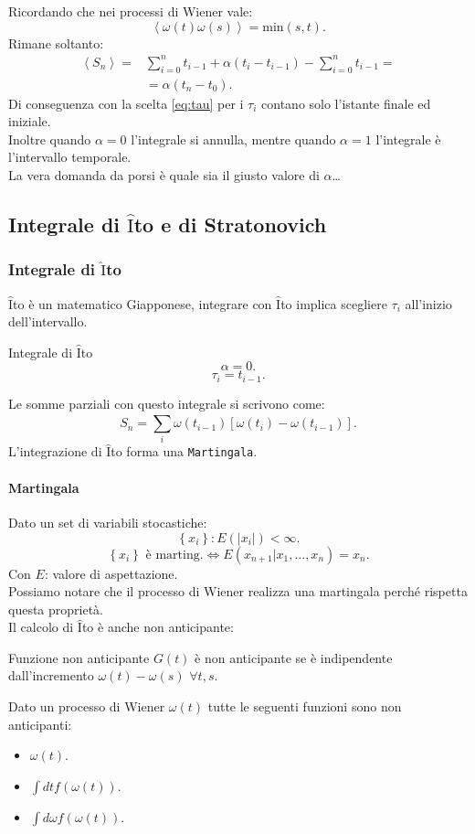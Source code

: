 Ricordando che nei processi di Wiener vale:
\[
    \left<\omega (t) \omega (s) \right> = \text{min}(s,t) 
.\] 
Rimane soltanto:
\[\begin{aligned}
    \left<S_n\right> =& \sum_{i=0}^{n} t_{i-1} + \alpha (t_i-t_{i-1}) -\sum_{i=0}^{n} t_{i-1} = \\
		      & =\alpha(t_n-t_0) 
.\end{aligned}\]
Di conseguenza con la scelta \ref{eq:tau} per i $\tau_i$ contano solo l'istante finale ed iniziale. \\
Inoltre quando $\alpha =0$ l'integrale si annulla, mentre quando $\alpha =1$ l'integrale è l'intervallo temporale.\\
La vera domanda da porsi è quale sia il giusto valore di $\alpha$\ldots
\subsection{Integrale di $\hat{\text{I}}$to e di Stratonovich}%
\label{sub:Integrale di Ito e di Stratonovich}
\subsubsection{Integrale di $\hat{\text{I}}$to}%
\label{subsub:Integrale di Ito}
$\hat{\text{I}}$to è un matematico Giapponese, integrare con $\hat{\text{I}}$to implica scegliere $\tau_i$ all'inizio dell'intervallo.
\begin{bluebox}{Integrale di $\hat{\text{I}}$to}
    \[
        \alpha  = 0
    .\] 
    \[
	\tau_i = t_{i-1}
    .\] 
\end{bluebox}
\noindent
Le somme parziali con questo integrale si scrivono come:
\[
    S_n = \sum_{i}^{} \omega (t_{i-1}) \left[\omega (t_i) -\omega (t_{i-1}) \right]
.\]
L'integrazione di $\hat{\text{I}}$to forma una \texttt{Martingala}.
\paragraph{Martingala}%
\label{par:Martingala}
Dato un set di variabili stocastiche:
\[
    \left\{x_i\right\}: E(\left|x_i\right|) < \infty
.\] 
\[
    \left\{x_i\right\} \text{ è marting.} \iff
    E(x_{n+1}|x_1,\ldots,x_n) = x_n
.\] 
Con $E$: valore di aspettazione.\\
Possiamo notare che il processo di Wiener realizza una martingala perché rispetta questa proprietà.\\
Il calcolo di $\hat{\text{I}}$to è anche non anticipante:
\begin{redbox}{Funzione non anticipante}
    $G(t)$ è non anticipante se è indipendente dall'incremento $\omega (t) - \omega (s) $ $\forall t, s$.
\end{redbox}
\noindent
\begin{exmp}
    Dato un processo di Wiener $\omega (t)$ tutte le seguenti funzioni sono non anticipanti:
    \begin{itemize}
	\item $\omega (t) $.
	\item $\int dt f(\omega (t) ) $.
	\item $\int d\omega f(\omega (t) ) $.
    \end{itemize}
\end{exmp}
\noindent
